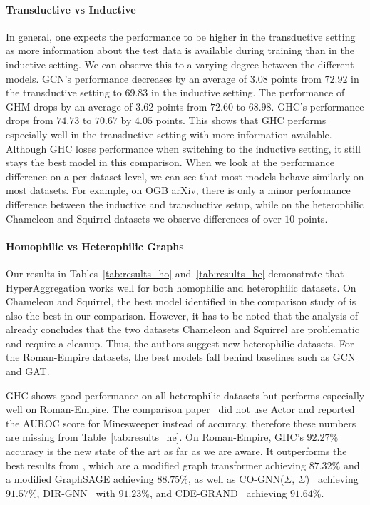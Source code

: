 \documentclass[conference]{IEEEtran}
\begin{document}
\paragraph*{Transductive vs Inductive}

In general, one expects the performance to be higher in the transductive setting as more information about the test data is available during training than in the inductive setting.
We can observe this to a varying degree between the different models.
GCN's performance decreases by an average of $3.08$ points from $72.92$ in the transductive setting to $69.83$ in the inductive setting.
The performance of GHM drops by an average of $3.62$ points from $72.60$ to $68.98$.
GHC's performance drops from $74.73$ to $70.67$ by $4.05$ points. 
This shows that GHC performs especially well in the transductive setting with more information available.
Although GHC loses performance when switching to the inductive setting, it still stays the best model in this comparison.
When we look at the performance difference on a per-dataset level, we can see that most models behave similarly on most datasets.
For example, on OGB arXiv, there is only a minor performance difference between the inductive and transductive setup, while on the heterophilic Chameleon and Squirrel datasets we observe differences of over $10$ points.

\paragraph*{Homophilic vs Heterophilic Graphs}
Our results in Tables~\ref{tab:results_ho} and~\ref{tab:results_he} demonstrate that HyperAggregation works well for both homophilic and heterophilic datasets.
On Chameleon and Squirrel, the best model identified in the comparison study of \citet{heter} is also the best in our comparison.
However, it has to be noted that the analysis of \citet{heter} already concludes that the two datasets Chameleon and Squirrel are problematic and require a cleanup.
Thus, the authors suggest new heterophilic datasets.
For the Roman-Empire datasets, the best models fall behind baselines such as GCN and GAT.

GHC shows good performance on all heterophilic datasets but performs especially well on Roman-Empire.
The comparison paper~\cite{heter} did not use Actor and reported the AUROC score for Minesweeper instead of accuracy, therefore these numbers are missing from Table~\ref{tab:results_he}.
On Roman-Empire, GHC's $92.27\%$ accuracy is the new state of the art as far as we are aware.
It outperforms the best results from \citet{heter}, which are a modified graph transformer achieving $87.32\%$ and a modified GraphSAGE achieving $88.75\%$, as well as CO-GNN($\Sigma$, $\Sigma$)~\cite{finkelshtein2023cooperative} achieving $91.57\%$, DIR-GNN~\cite{rossi2023edge} with $91.23\%$, and CDE-GRAND~\cite{zhao2023graph} achieving $91.64\%$.
\end{document}
